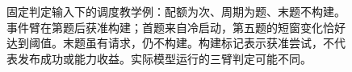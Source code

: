 \begin{figure}[htbp]
\centering

\caption{固定判定输入下的调度教学例：配额为次、周期为题、末题不构建。事件臂在第题后获准构建；首题来自冷启动，第五题的短窗变化恰好达到阈值。末题虽有请求，仍不构建。构建标记表示获准尝试，不代表发布成功或能力收益。实际模型运行的三臂判定可能不同。}
\label{fig:ch13-trigger}
\end{figure}
